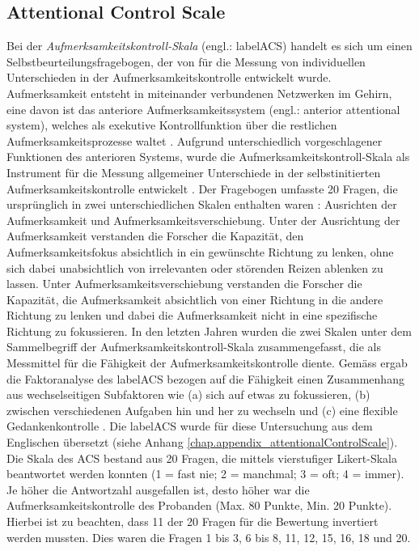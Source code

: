 \subsection{Attentional Control Scale} \label{subsection.acs}
Bei der \textit{Aufmerksamkeitskontroll-Skala} (engl.: \gls{labelACS}) handelt es sich um einen Selbstbeurteilungsfragebogen, der von  für die Messung von individuellen Unterschieden in der Aufmerksamkeitskontrolle entwickelt wurde. Aufmerksamkeit entsteht in miteinander verbundenen Netzwerken im Gehirn, eine davon ist das anteriore Aufmerksamkeitssystem (engl.: anterior attentional system), welches als exekutive Kontrollfunktion über die restlichen Aufmerksamkeitsprozesse waltet \cite{Posner1998}. Aufgrund unterschiedlich vorgeschlagener Funktionen des anterioren Systems, wurde die Aufmerksamkeitskontroll-Skala als Instrument für die Messung allgemeiner Unterschiede in der selbstinitierten Aufmerksamkeitskontrolle entwickelt \cite{Derryberry2001}. Der Fragebogen umfasste 20 Fragen, die ursprünglich in zwei unterschiedlichen Skalen enthalten waren \cite{Derryberry1988}: Ausrichten der Aufmerksamkeit und Aufmerksamkeitsverschiebung. Unter der Ausrichtung der Aufmerksamkeit verstanden die Forscher die Kapazität, den Aufmerksamkeitsfokus absichtlich in ein gewünschte Richtung zu lenken, ohne sich dabei unabsichtlich von irrelevanten oder störenden Reizen ablenken zu lassen. Unter Aufmerksamkeitsverschiebung verstanden die Forscher die Kapazität, die Aufmerksamkeit absichtlich von einer Richtung in die andere Richtung zu lenken und dabei die Aufmerksamkeit nicht in eine spezifische Richtung zu fokussieren. In den letzten Jahren wurden die zwei Skalen unter dem Sammelbegriff der Aufmerksamkeitskontroll-Skala zusammengefasst, die als Messmittel für die Fähigkeit der Aufmerksamkeitskontrolle diente. Gemäss  ergab die Faktoranalyse des \gls{labelACS} bezogen auf die Fähigkeit einen Zusammenhang aus wechselseitigen Subfaktoren wie (a) sich auf etwas zu fokussieren, (b) zwischen verschiedenen Aufgaben hin und her zu wechseln und (c) eine flexible Gedankenkontrolle \cite{Derryberry2002}. Die \gls{labelACS} wurde für diese Untersuchung aus dem Englischen übersetzt (siehe Anhang \ref{chap.appendix_attentionalControlScale}). Die Skala des ACS bestand aus 20 Fragen, die mittels vierstufiger Likert-Skala beantwortet werden konnten (1 = fast nie; 2 = manchmal; 3 = oft; 4 = immer). Je höher die Antwortzahl ausgefallen ist, desto höher war die Aufmerksamkeitskontrolle des Probanden (Max. 80 Punkte, Min. 20 Punkte). Hierbei ist zu beachten, dass 11 der 20 Fragen für die Bewertung invertiert werden mussten. Dies waren die Fragen 1 bis 3, 6 bis 8, 11, 12, 15, 16, 18 und 20.

